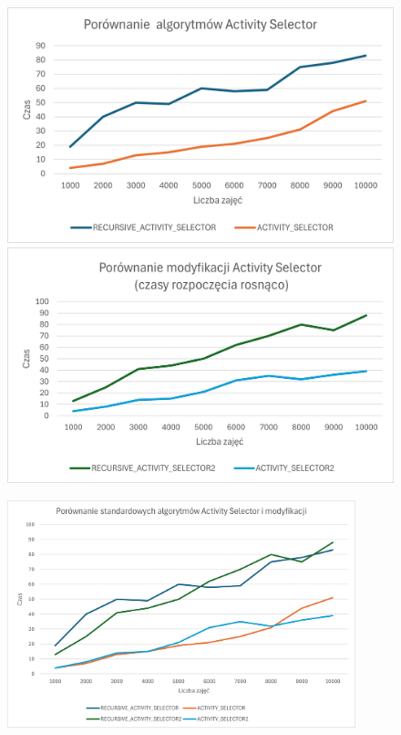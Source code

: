 \documentclass{article}
\begin{document}
		\begin{figure}[H]
		\begin{minipage}{0.5\textwidth}
			\centering
			\includegraphics[width=\textwidth]{AS1.png}
		\end{minipage}%
		\begin{minipage}{0.5\textwidth}
			\centering
			\includegraphics[width=\textwidth]{AS2.png}
		\end{minipage}
		\end{figure}
		
		\begin{figure}[H]
			\centering
			\includegraphics[width=0.9\textwidth]{PorAS.png}
		\end{figure}
		
\end{document}
